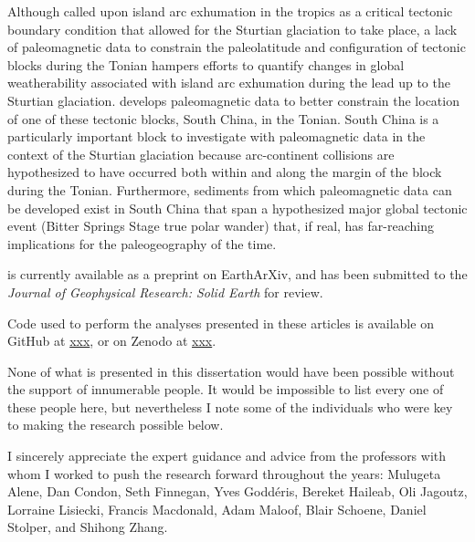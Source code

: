 \documentclass{ucbthesis}
\begin{document}
\begin{frontmatter}
\begin{preface}
\bigskip

Although \citet{Park2020a} called upon island arc exhumation in the tropics as a critical tectonic boundary condition that allowed for the Sturtian glaciation to take place, a lack of paleomagnetic data to constrain the paleolatitude and configuration of tectonic blocks during the Tonian hampers efforts to quantify changes in global weatherability associated with island arc exhumation during the lead up to the Sturtian glaciation. \citet{Park2020c} develops paleomagnetic data to better constrain the location of one of these tectonic blocks, South China, in the Tonian. South China is a particularly important block to investigate with paleomagnetic data in the context of the Sturtian glaciation because arc-continent collisions are hypothesized to have occurred both within and along the margin of the block during the Tonian. Furthermore, sediments from which paleomagnetic data can be developed exist in South China that span a hypothesized major global tectonic event (Bitter Springs Stage true polar wander) that, if real, has far-reaching implications for the paleogeography of the time.

\citet{Park2020c} is currently available as a preprint on EarthArXiv, and has been submitted to the \textit{Journal of Geophysical Research: Solid Earth} for review.

Code used to perform the analyses presented in these articles is available on GitHub at \url{xxx}, or on Zenodo at \url{xxx}.

\end{preface}


\begin{acknowledgements}

None of what is presented in this dissertation would have been possible without the support of innumerable people. It would be impossible to list every one of these people here, but nevertheless I note some of the individuals who were key to making the research possible below.

I sincerely appreciate the expert guidance and advice from the professors with whom I worked to push the research forward throughout the years: Mulugeta Alene, Dan Condon, Seth Finnegan, Yves Godd\'eris, Bereket Haileab, Oli Jagoutz, Lorraine Lisiecki, Francis Macdonald, Adam Maloof, Blair Schoene, Daniel Stolper, and Shihong Zhang.


\end{acknowledgements}
\end{frontmatter}
\end{document}
